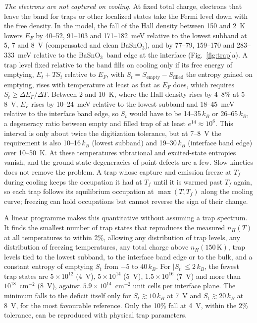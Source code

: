 \documentclass[11pt]{article}
\newcommand{\BSO}{\texorpdfstring{BaSnO$_3$}{BaSnO3}}
\begin{document}
\emph{The electrons are not captured on cooling.} At fixed total charge, electrons that leave the band for traps or other localized states take the Fermi level down with the free density. In the model, the fall of the Hall density between 150 and 2~K lowers $E_F$ by 40--52, 91--103 and 171--182~meV relative to the lowest subband at 5, 7 and 8~V (compensated and clean \BSO), and by 77--79, 159--170 and 283--333~meV relative to the \BSO\ band edge at the interface (Fig.~\ref{fig:trap}a). A trap level fixed relative to the band fills on cooling only if its free energy of emptying, $E_t+TS_t$ relative to $E_F$, with $S_t=S_\mathrm{empty}-S_\mathrm{filled}$ the entropy gained on emptying, rises with temperature at least as fast as $E_F$ does, which requires $S_t\ge\Delta E_F/\Delta T$. Between 2 and 10~K, where the Hall density rises by 4--8\% at 5--8~V, $E_F$ rises by 10--24~meV relative to the lowest subband and 18--45~meV relative to the interface band edge, so $S_t$ would have to be 14--35\,$k_B$ or 26--65\,$k_B$, a degeneracy ratio between empty and filled trap of at least $e^{14}\approx10^6$. This interval is only about twice the digitization tolerance, but at 7--8~V the requirement is also 10--16\,$k_B$ (lowest subband) and 19--30\,$k_B$ (interface band edge) over 10--50~K. At these temperatures vibrational and excited-state entropies vanish, and the ground-state degeneracies of point defects are a few. Slow kinetics does not remove the problem. A trap whose capture and emission freeze at $T_f$ during cooling keeps the occupation it had at $T_f$ until it is warmed past $T_f$ again, so each trap follows its equilibrium occupation at $\max(T,T_f)$ along the cooling curve; freezing can hold occupations but cannot reverse the sign of their change.

A linear programme makes this quantitative without assuming a trap spectrum. It finds the smallest number of trap states that reproduces the measured $n_H(T)$ at all temperatures to within 2\%, allowing any distribution of trap levels, any distribution of freezing temperatures, any total charge above $n_H(150\,\mathrm{K})$, trap levels tied to the lowest subband, to the interface band edge or to the bulk, and a constant entropy of emptying $S_t$ from $-5$ to $40\,k_B$. For $|S_t|\le2\,k_B$, the fewest trap states are $5\times10^{12}$ (4~V), $5\times10^{14}$ (5~V), $1.5\times10^{16}$ (7~V) and more than $10^{18}$~cm$^{-2}$ (8~V), against $5.9\times10^{14}$~cm$^{-2}$ unit cells per interface plane. The minimum falls to the deficit itself only for $S_t\gtrsim10\,k_B$ at 7~V and $S_t\gtrsim20\,k_B$ at 8~V, for the most favourable reference. Only the 10\% fall at 4~V, within the 2\% tolerance, can be reproduced with physical trap parameters.
\end{document}
